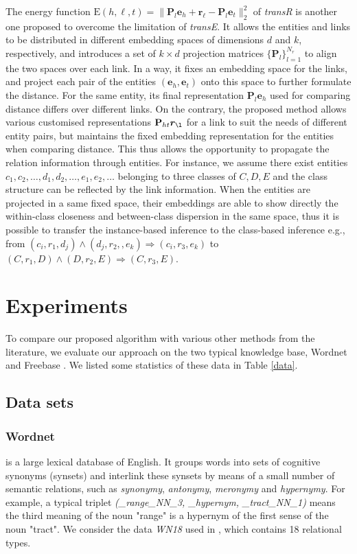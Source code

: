 \documentclass[10pt,journal]{IEEEtran}
\begin{document}
The energy function  $\mathrm{E}{(h,\ell, t)} = \|\textbf{P}_l\bm{e}_h + \bm{r}_{\ell}-\textbf{P}_l\bm{e}_t\|_2^2$ of \emph{transR} \cite{lin_learning_2015} is another one proposed to overcome the limitation of   \emph{transE}. It allows the entities and links to be distributed in different embedding spaces of dimensions $d$ and $k$, respectively, and  introduces a set of $ k\times d$ projection matrices $\{\textbf{P}_l\}_{l=1}^{N_r}$ to align the two spaces over each link. In a way, it fixes an embedding space for the links, and project each pair of the entities $(\bm{e}_h, \bm{e}_t)$ onto this space to further formulate the distance. For the same entity,  its final representation $\textbf{P}_l\bm{e}_h$ used for comparing distance  differs over different links. On the contrary, the proposed method allows various customised representations $\textbf{P}_{ht} \bm{r}_{\l}$ for a link to suit the needs of different entity pairs, but maintains the fixed embedding representation for the entities when comparing distance. This thus allows the opportunity to propagate the relation information through entities. For instance, we assume there exist entities $c_1,c_2, \ldots,d_1,d_2,\ldots, e_1, e_2, \ldots$ belonging to three classes of $C,D,E$ and the class structure can be reflected by the link information.   When the entities are projected in a same fixed space,  their embeddings are able to  show directly the within-class closeness and between-class dispersion in the same space, thus it is possible to  transfer the instance-based inference to the class-based inference e.g., from $(c_i, r_1, d_j) \wedge (d_j, r_2,, e_k) \Rightarrow  (c_i, r_3, e_k)$ to $(C, r_1, D)\wedge (D, r_2, E) \Rightarrow  (C, r_3, E)$.



\section{Experiments} \label{exp}
To compare our proposed algorithm with various other methods from the literature, we evaluate our approach on the two typical knowledge base, Wordnet \cite{miller_wordnet:_1995} and Freebase \cite{bollacker_freebase:_2008}. We listed some statistics of these data in Table \ref{data}.

\subsection{Data sets}
\subsubsection{Wordnet} is a large lexical database of English. It groups words into sets of cognitive synonyms (synsets) and interlink these synsets by means of a small number of semantic relations, such as \emph{synonymy}, \emph{antonymy}, \emph{meronymy} and \emph{hypernymy}.  For example, a typical triplet \emph{(\_range\_NN\_3, \_hypernym, \_tract\_NN\_1)} means the third meaning of the noun "range"  is a hypernym of the first sense of the noun "tract". We consider the data \emph{WN18} used in \cite{bordes_semantic_2014}, which contains 18 relational types.
\end{document}
